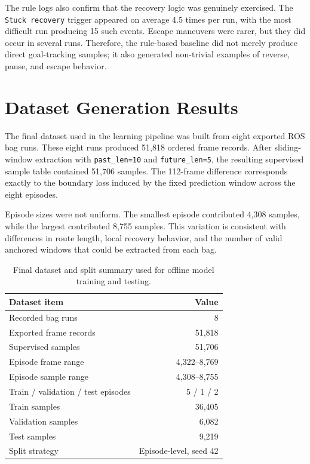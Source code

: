 The rule logs also confirm that the recovery logic was genuinely exercised. The \texttt{Stuck recovery} trigger appeared on average 4.5 times per run, with the most difficult run producing 15 such events. Escape maneuvers were rarer, but they did occur in several runs. Therefore, the rule-based baseline did not merely produce direct goal-tracking samples; it also generated non-trivial examples of reverse, pause, and escape behavior.

\section{Dataset Generation Results}

The final dataset used in the learning pipeline was built from eight exported ROS bag runs. These eight runs produced 51,818 ordered frame records. After sliding-window extraction with \texttt{past\_len=10} and \texttt{future\_len=5}, the resulting supervised sample table contained 51,706 samples. The 112-frame difference corresponds exactly to the boundary loss induced by the fixed prediction window across the eight episodes.

Episode sizes were not uniform. The smallest episode contributed 4,308 samples, while the largest contributed 8,755 samples. This variation is consistent with differences in route length, local recovery behavior, and the number of valid anchored windows that could be extracted from each bag.

\begin{table}[tbp]
    \caption{Final dataset and split summary used for offline model training and testing.}
    \label{tab:dataset_result_summary}
    \centering
    \small
    \setlength{\tabcolsep}{5pt}
    \renewcommand{\arraystretch}{1.12}
    \begin{tabular}{@{}lr@{}}
        \toprule
        \textbf{Dataset item} & \textbf{Value} \\
        \midrule
        Recorded bag runs & 8 \\
        Exported frame records & 51,818 \\
        Supervised samples & 51,706 \\
        Episode frame range & 4,322--8,769 \\
        Episode sample range & 4,308--8,755 \\
        Train / validation / test episodes & 5 / 1 / 2 \\
        Train samples & 36,405 \\
        Validation samples & 6,082 \\
        Test samples & 9,219 \\
        Split strategy & Episode-level, seed 42 \\
        \bottomrule
    \end{tabular}
\end{table}

